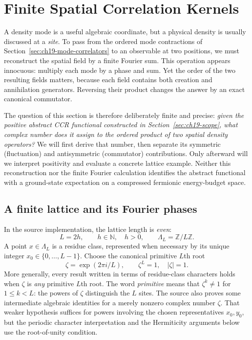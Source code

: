 \section{Finite Spatial Correlation Kernels}
\label{sec:ch19-spatial-correlators}

A density mode is a useful algebraic coordinate, but a physical density is
usually discussed at a \emph{site}.  To pass from the ordered mode
contractions of Section~\ref{sec:ch19-mode-correlators} to an observable
at two positions, we must reconstruct the spatial field by a finite Fourier
sum.  This operation appears innocuous: multiply each mode by a phase and
sum.  Yet the order of the two resulting fields matters, because each field
contains both creation and annihilation generators.  Reversing their product
changes the answer by an exact canonical commutator.

The question of this section is therefore deliberately finite and precise:
\emph{given the positive abstract CCR functional constructed in
Section~\ref{sec:ch19-scope}, what complex number does it assign to the
ordered product of two spatial density operators?}  We will first derive
that number, then separate its symmetric (fluctuation) and antisymmetric
(commutator) contributions.  Only afterward will we interpret positivity
and evaluate a concrete lattice example.  Neither this reconstruction nor
the finite Fourier calculation identifies the abstract functional with a
ground-state expectation on a compressed fermionic energy-budget space.

\subsection{A finite lattice and its Fourier phases}

In the source implementation, the lattice length is \emph{even}:
\begin{equation}
 L=2h,\qquad h\in\mathbb N,\quad h>0,\qquad
 \Lambda_L=\mathbb Z/L\mathbb Z.
 \label{eq:ch19-spatial-lattice}
\end{equation}
A point $x\in\Lambda_L$ is a residue class, represented when necessary
by its unique integer $x_0\in\{0,\ldots,L-1\}$.  Choose the canonical
primitive $L$th root
\begin{equation}
 \zeta=\exp(2\pi i/L),\qquad \zeta^L=1,
 \quad |\zeta|=1.
 \label{eq:ch19-spatial-zeta}
\end{equation}
More generally, every result written in terms of residue-class
characters holds when $\zeta$ is \emph{any} primitive $L$th root.
The word \emph{primitive} means that $\zeta^k\ne1$ for
$1\leq k<L$: the powers of $\zeta$ distinguish the $L$ sites.
The source also proves some intermediate algebraic identities for a
merely nonzero complex number $\zeta$.  That weaker hypothesis suffices
for powers involving the chosen representatives $x_0,y_0$, but the
periodic character interpretation and the Hermiticity arguments below
use the root-of-unity condition.

